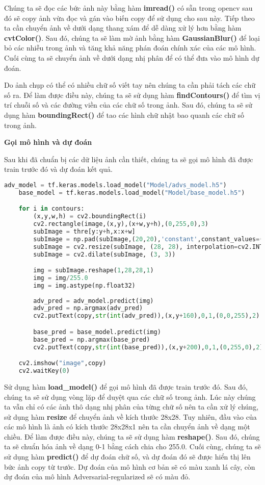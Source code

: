 Chúng ta sẽ đọc các bức ảnh này bằng hàm \textbf{imread()} có sẵn trong opencv sau đó sẽ copy ảnh vừa đọc và gán vào biến copy để sử dụng cho sau này.
Tiếp theo ta cần chuyển ảnh về dưới dạng thang xám để dễ dàng xử lý hơn bằng hàm \textbf{cvtColor()}.
Sau đó, chúng ta sẽ làm mờ ảnh bằng hàm \textbf{GaussianBlur()} để loại bỏ các nhiễu trong ảnh và tăng khả năng phán đoán chính xác của các mô hình.
Cuối cùng ta sẽ chuyển ảnh về dưới dạng nhị phân để có thể đưa vào mô hình dự đoán.

Do ảnh chụp có thể có nhiều chữ số viết tay nên chúng ta cần phải tách các chữ số ra. Để làm được điều này, chúng ta sẽ sử dụng hàm \textbf{findContours()} 
để tìm vị trí chuỗi số và các đường viền của các chữ số trong ảnh. Sau đó, chúng ta sẽ sử dụng hàm \textbf{boundingRect()} để tao các hình chữ nhật bao quanh các chữ số trong ảnh.

\textbf{Gọi mô hình và dự đoán}

Sau khi đã chuẩn bị các dữ liệu ảnh cần thiết, chúng ta sẽ gọi mô hình đã được train trước đó và dự đoán kết quả.

\begin{lstlisting}[language = Python]
    adv_model = tf.keras.models.load_model("Model/advs_model.h5")
    base_model = tf.keras.models.load_model("Model/base_model.h5")

    for i in contours:
        (x,y,w,h) = cv2.boundingRect(i)
        cv2.rectangle(image,(x,y),(x+w,y+h),(0,255,0),3)
        subImage = thre[y:y+h,x:x+w]
        subImage = np.pad(subImage,(20,20),'constant',constant_values=(0,0))
        subImage = cv2.resize(subImage, (28, 28), interpolation=cv2.INTER_AREA)
        subImage = cv2.dilate(subImage, (3, 3))

        img = subImage.reshape(1,28,28,1)
        img = img/255.0
        img = img.astype(np.float32)
        
        adv_pred = adv_model.predict(img)
        adv_pred = np.argmax(adv_pred)
        cv2.putText(copy,str(int(adv_pred)),(x,y+160),0,1,(0,0,255),2)

        base_pred = base_model.predict(img)
        base_pred = np.argmax(base_pred)
        cv2.putText(copy,str(int(base_pred)),(x,y+200),0,1,(0,255,0),2)

    cv2.imshow("image",copy)
    cv2.waitKey(0)


\end{lstlisting}

Sử dụng hàm \textbf{load\_model()} để gọi mô hình đã được train trước đó. Sau đó, chúng ta sẽ sử dụng vòng lặp để duyệt qua các chữ số trong ảnh.
Lúc này chúng ta vẫn chỉ có các ảnh thô dạng nhị phân của từng chữ số nên ta cần xử lý chúng, sử dụng hàm \textbf{resize} để chuyển ảnh về kích thước 28x28.
Tuy nhiên, đầu vào của các mô hình là ảnh có kích thước 28x28x1 nên ta cần chuyển ảnh về dạng một chiều. Để làm được điều này, chúng ta sẽ sử dụng hàm \textbf{reshape()}.
Sau đó, chúng ta sẽ chuẩn hóa ảnh về dạng 0-1 bằng cách chia cho 255.0. Cuối cùng, chúng ta sẽ sử dụng hàm \textbf{predict()} để dự đoán chữ số, và dự đoán đó sẽ được hiển 
thị lên bức ảnh copy từ trước. Dự đoán của mô hình cơ bản sẽ có màu xanh lá cây, còn dự đoán của mô hình Adversarial-regularized sẽ có màu đỏ.

